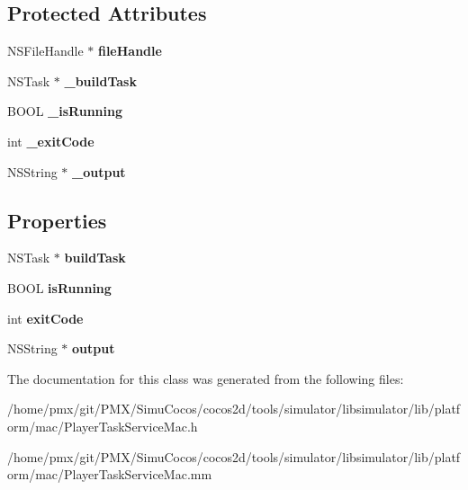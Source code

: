 \subsection*{Protected Attributes}
\begin{DoxyCompactItemize}
\item 
\mbox{\label{interfacePlayerTaskPrivate_a64a94029e9ae4da3db17e6198e65900b}} 
N\+S\+File\+Handle $\ast$ {\bfseries file\+Handle}
\item 
\mbox{\label{interfacePlayerTaskPrivate_ae73ec5d971a15afdaca7f0a84d57a993}} 
N\+S\+Task $\ast$ {\bfseries \+\_\+build\+Task}
\item 
\mbox{\label{interfacePlayerTaskPrivate_a925f9504ccb020c7561b2c464d1b34b2}} 
B\+O\+OL {\bfseries \+\_\+is\+Running}
\item 
\mbox{\label{interfacePlayerTaskPrivate_a3911d974782718ab2251ca4f0ce698a2}} 
int {\bfseries \+\_\+exit\+Code}
\item 
\mbox{\label{interfacePlayerTaskPrivate_a4b3b1a222d70c93ae7c2760b9ee2d571}} 
N\+S\+String $\ast$ {\bfseries \+\_\+output}
\end{DoxyCompactItemize}
\subsection*{Properties}
\begin{DoxyCompactItemize}
\item 
\mbox{\label{interfacePlayerTaskPrivate_a022ffd0604c1dcf359ecec29cbeac504}} 
N\+S\+Task $\ast$ {\bfseries build\+Task}
\item 
\mbox{\label{interfacePlayerTaskPrivate_add9a9aa74b9bb08413ab2f3c011482a0}} 
B\+O\+OL {\bfseries is\+Running}
\item 
\mbox{\label{interfacePlayerTaskPrivate_a9b1a289784985da4831704b99f109208}} 
int {\bfseries exit\+Code}
\item 
\mbox{\label{interfacePlayerTaskPrivate_acc33c9bbb40eded58328b5e58f23e3d2}} 
N\+S\+String $\ast$ {\bfseries output}
\end{DoxyCompactItemize}


The documentation for this class was generated from the following files\+:\begin{DoxyCompactItemize}
\item 
/home/pmx/git/\+P\+M\+X/\+Simu\+Cocos/cocos2d/tools/simulator/libsimulator/lib/platform/mac/Player\+Task\+Service\+Mac.\+h\item 
/home/pmx/git/\+P\+M\+X/\+Simu\+Cocos/cocos2d/tools/simulator/libsimulator/lib/platform/mac/Player\+Task\+Service\+Mac.\+mm\end{DoxyCompactItemize}
